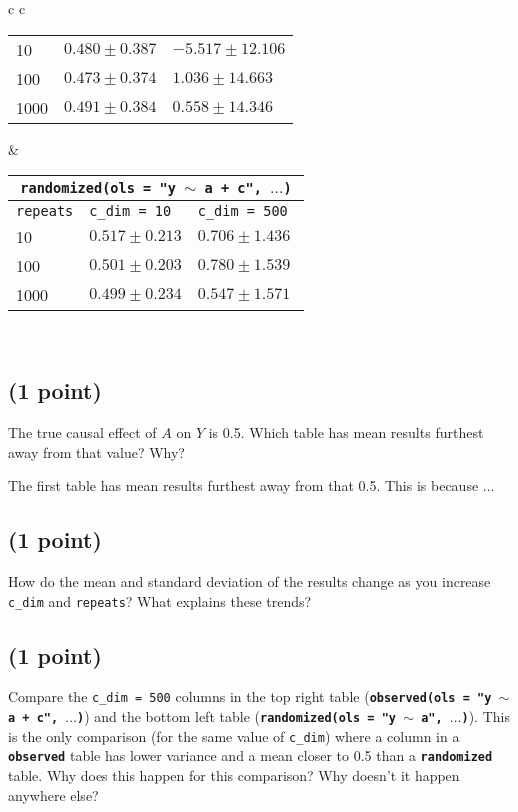 \documentclass[12pt]{article}
\begin{document}
\begin{center}
\begin{tabularx}{\textwidth}{c c}
{\begin{tabularx}{0.45\linewidth}{l l l}
\midrule
10   & $0.480 \pm 0.387$    & $-5.517 \pm 12.106$  \\
100  & $0.473 \pm 0.374$    & $1.036 \pm 14.663$   \\
1000 & $0.491 \pm 0.384$    & $0.558 \pm 14.346$   \\
\bottomrule
\end{tabularx}
}
& 
{
\centering
\begin{tabularx}{0.45\linewidth}{l l l}
\multicolumn{3}{c}{{\tt \bf randomized(ols = "y $\sim$ a + c", $\ldots$)}} \\
\midrule
{\tt repeats} & {\tt c\_dim = 10} & {\tt c\_dim = 500 }\\
\midrule
10   & $0.517 \pm 0.213$     & $0.706 \pm 1.436$    \\
100  & $0.501 \pm 0.203$     & $0.780 \pm 1.539$    \\
1000 & $0.499 \pm 0.234$     & $0.547 \pm 1.571$    \\
\bottomrule
\end{tabularx}
} \\ 
\end{tabularx}
\end{center}

\subsection{(1 point)}

The true causal effect of $A$ on $Y$ is 0.5. Which table has mean results furthest away from that value? Why?

The first table has mean results furthest away from that 0.5. This is because ...

\subsection{(1 point)}

How do the mean and standard deviation of the results change as you increase {\tt c\_dim} and {\tt repeats}? What explains these trends?

\subsection{(1 point)}

Compare the {\tt c\_dim = 500} columns in the top right table ({\tt \bf observed(ols = "y $\sim$ a + c", $\ldots$)}) and the bottom left table ({\tt \bf randomized(ols = "y $\sim$ a", $\ldots$)}). This is the only comparison (for the same value of {\tt c\_dim}) where a column in a {\tt \bf observed} table has lower variance and a mean closer to 0.5 than a {\tt \bf randomized} table. Why does this happen for this comparison? Why doesn't it happen anywhere else?
\end{document}
